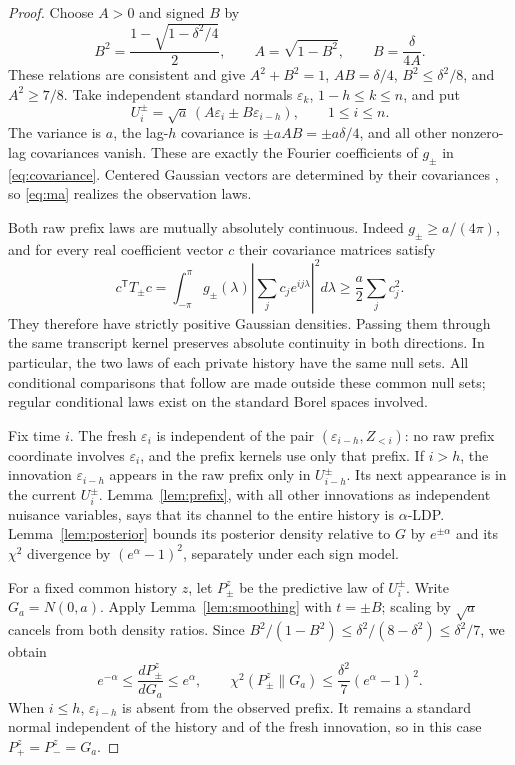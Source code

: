 \documentclass[11pt]{article}
\theoremstyle{remark}
\begin{document}
\begin{proof}
Choose $A>0$ and signed $B$ by
\begin{equation}\label{eq:ma-coefficients}
 B^2=\frac{1-\sqrt{1-\delta^2/4}}2,
 \qquad A=\sqrt{1-B^2},\qquad B=\frac{\delta}{4A}.
\end{equation}
These relations are consistent and give
$A^2+B^2=1$, $AB=\delta/4$, $B^2\le\delta^2/8$, and $A^2\ge7/8$.
Take independent standard normals $\varepsilon_k$, $1-h\le k\le n$, and
put
\begin{equation}\label{eq:ma}
 U_i^\pm=\sqrt a\,(A\varepsilon_i\pm B\varepsilon_{i-h}),
 \qquad 1\le i\le n.
\end{equation}
The variance is $a$, the lag-$h$ covariance is $\pm aAB=\pm a\delta/4$,
and all other nonzero-lag covariances vanish. These are exactly the Fourier
coefficients of $g_\pm$ in \eqref{eq:covariance}. Centered Gaussian vectors
are determined by their covariances \cite[Section 3.10]{Durrett}, so
\eqref{eq:ma} realizes the observation laws.

Both raw prefix laws are mutually absolutely continuous. Indeed
$g_\pm\ge a/(4\pi)$, and for every real coefficient vector $c$ their
covariance matrices satisfy
\[
 c^{\mathsf T}T_\pm c
 =\int_{-\pi}^{\pi}g_\pm(\lambda)
        \left|\sum_jc_j e^{ij\lambda}\right|^2d\lambda
 \ge\frac a2\sum_j c_j^2.
\]
They therefore have strictly positive Gaussian densities. Passing them
through the same transcript kernel preserves absolute continuity in both
directions. In particular, the two laws of each private history have the
same null sets. All conditional comparisons that follow are made outside
these common null sets; regular conditional laws exist on the standard
Borel spaces involved.

Fix time $i$. The fresh $\varepsilon_i$ is independent of the pair
$(\varepsilon_{i-h},Z_{<i})$: no raw prefix coordinate involves
$\varepsilon_i$, and the prefix kernels use only that prefix. If $i>h$,
the innovation $\varepsilon_{i-h}$ appears in the raw prefix only in
$U_{i-h}^\pm$. Its next appearance is in the current $U_i^\pm$.
Lemma~\ref{lem:prefix}, with all other innovations as independent nuisance
variables, says that its channel to the entire history is $\alpha$-LDP.
Lemma~\ref{lem:posterior} bounds its posterior density relative to $G$ by
$e^{\pm\alpha}$ and its $\chi^2$ divergence by $(e^\alpha-1)^2$,
separately under each sign model.

For a fixed common history $z$, let $P_\pm^z$ be the predictive law of
$U_i^\pm$. Write $G_a=N(0,a)$. Apply Lemma~\ref{lem:smoothing} with
$t=\pm B$; scaling by $\sqrt a$ cancels from both density ratios. Since
$B^2/(1-B^2)\le\delta^2/(8-\delta^2)\le\delta^2/7$, we obtain
\begin{equation}\label{eq:predictive}
 e^{-\alpha}\le\frac{dP_\pm^z}{dG_a}\le e^\alpha,
 \qquad \chi^2(P_\pm^z\|G_a)
        \le\frac{\delta^2}{7}(e^\alpha-1)^2.
\end{equation}
When $i\le h$, $\varepsilon_{i-h}$ is absent from the observed prefix.
It remains a standard normal independent of the history and of the fresh
innovation, so in this case $P_+^z=P_-^z=G_a$.


\end{proof}
\end{document}
